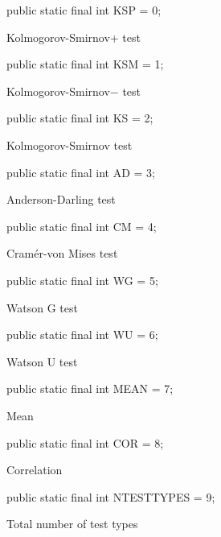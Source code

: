 \begin{code}

   public  static final int KSP = 0;
\end{code}
\begin{tabb} Kolmogorov-Smirnov+ test \end{tabb}
\begin{code}

   public static final int KSM = 1;
\end{code}
\begin{tabb}   Kolmogorov-Smirnov$-$ test \end{tabb}
\begin{code}

   public static final int KS = 2;
\end{code}
\begin{tabb}   Kolmogorov-Smirnov test  \end{tabb}
\begin{code}

   public static final int AD = 3;
\end{code}
\begin{tabb}   Anderson-Darling test  \end{tabb}
\begin{code}

   public static final int CM = 4;
\end{code}
\begin{tabb}   Cram\'er-von Mises test  \end{tabb}
\begin{code}

   public static final int WG = 5;
\end{code}
\begin{tabb}   Watson G test  \end{tabb}
\begin{code}

   public static final int WU = 6;
\end{code}
\begin{tabb}   Watson U test   \end{tabb}
\begin{code}

   public static final int MEAN = 7;
\end{code}
\begin{tabb}   Mean  \end{tabb}
\begin{code}

   public static final int COR = 8;
\end{code}
\begin{tabb}   Correlation  \end{tabb}
\begin{code}

   public static final int NTESTTYPES = 9;
\end{code}
\begin{tabb}   Total number of test types  \end{tabb}

